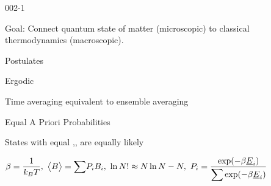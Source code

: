 \begin{mitframe}{002-1} %

    
	\begin{listone}
    
    	\item Goal: Connect quantum state of matter (microscopic) to classical thermodynamics (macroscopic).
    
    	\item Postulates
    
    	\begin{listtwo}
    
    		\item Ergodic
        
        	\begin{listthree}
        
    			\item Time averaging equivalent to ensemble averaging

			\end{listthree}

    		\item Equal A Priori Probabilities
        
       			\begin{listthree}
        
    				\item States with equal \nummoles,\uline{\vol},\uline{\energy} are equally likely
    
    			\end{listthree}
    
    	\end{listtwo}
    
    	\item $\boltznorm = \dfrac{1}{\boltz\Temp},~\big\langle\genvar\big\rangle = \mathlarger\sum\nolimits\prob{i}\genvar_{\state},~\ln\nummoles!\approx \nummoles\ln\nummoles - \nummoles,~\prob{i} = \dfrac{\exp(-\boltznorm\uline{\energy}_{\state})}{\mathlarger\sum\nolimits\exp(-\boltznorm\uline{\energy}_{\state})}$
 
    

\end{listone}
\end{mitframe}
